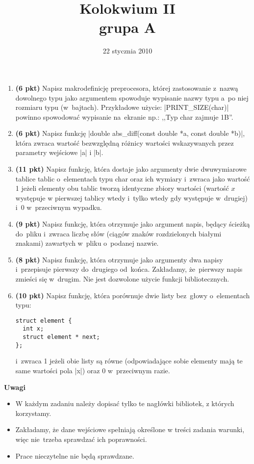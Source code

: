 \documentclass[12pt]{article}
\title{Kolokwium II\\grupa A}
\date{22 stycznia 2010}
\begin{document}
\maketitle
\DefineShortVerb{\|}
\thispagestyle{empty}
\begin{enumerate}


\item \textbf{(6 pkt)}
Napisz makrodefinicję preprocesora,
której zastosowanie z~nazwą dowolnego
typu jako argumentem spowoduje wypisanie
nazwy typu a~po niej rozmiaru typu (w~bajtach).
Przykładowe użycie: |PRINT_SIZE(char)|
powinno spowodować wypisanie na~ekranie np.:
,,Typ char zajmuje 1B''.

\item \textbf{(6 pkt)}
Napisz funkcję |double abs_diff(const double *a, const double *b)|,
która zwraca wartość bezwzględną różnicy
wartości wskazywanych przez parametry wejściowe |a| i |b|.

\item \textbf{(11 pkt)}
Napisz funkcję, która dostaje jako argumenty
dwie dwuwymiarowe tablice tablic o~elementach
typu char oraz ich wymiary
i~zwraca jako wartość 1
jeżeli elementy obu tablic tworzą identyczne
zbiory wartości (wartość $x$ występuje
w pierwszej tablicy wtedy i~tylko wtedy
gdy występuje w~drugiej)
i~0 w~przeciwnym wypadku.

\item \textbf{(9 pkt)}
Napisz funkcję, która otrzymuje jako argument
napis, będący ścieżką do~pliku
i~zwraca liczbę słów
(ciągów znaków rozdzielonych białymi znakami)
zawartych w~pliku o~podanej nazwie.

\item \textbf{(8 pkt)}
Napisz funkcję, która otrzymuje jako argumenty
dwa napisy i~przepisuje pierwszy do~drugiego od~końca.
Zakładamy, że~pierwszy napis zmieści się w~drugim.
Nie jest dozwolone użycie funkcji bibliotecznych.

\item \textbf{(10 pkt)}
Napisz funkcję, która porównuje dwie listy
bez~głowy o~elementach typu:
\begin{verbatim}
struct element {
  int x;
  struct element * next;
};
\end{verbatim}
i~zwraca 1 jeżeli obie listy są równe
(odpowiadające sobie elementy mają
te same wartości pola |x|)
oraz 0 w~przeciwnym razie.

\end{enumerate}

\vspace{1cm}
\textbf{Uwagi}
\begin{itemize}
  \item W każdym zadaniu należy dopisać tylko te nagłówki bibliotek, z których korzystamy.
  \item Zakładamy, że dane wejściowe spełniają określone w treści zadania warunki,
        więc nie~trzeba sprawdzać ich poprawności.
  \item Prace nieczytelne nie będą sprawdzane.
\end{itemize}
\end{document}
